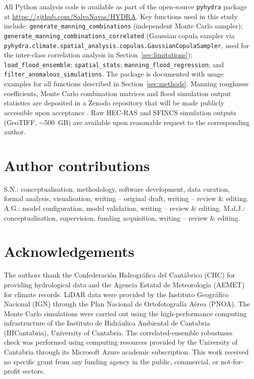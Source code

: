 \documentclass[review,12pt]{elsarticle}
\newcommand{\sfincs}{\textsc{SFINCS}}
\newcommand{\hecras}{\textsc{HEC-RAS}}
\begin{document}
\begin{sloppypar}
All Python analysis code is available as part of the open-source
\texttt{pyhydra} package at \url{https://github.com/SalvaNavas/HYDRA}.
Key functions used in this study include:
\texttt{generate\_manning\_combinations} (independent Monte Carlo sampler);
\texttt{generate\_manning\_combinations\_correlated}
(Gaussian copula sampler via
\texttt{pyhydra.climate.spatial\_analysis.copulas.GaussianCopulaSampler},
used for the inter-class correlation analysis in Section~\ref{sec:limitations});
\texttt{load\_flood\_ensemble};
\texttt{spatial\_stats};
\texttt{manning\_flood\_regression}; and
\texttt{filter\_anomalous\_simulations}.
The package is documented with usage examples for all functions described
in Section~\ref{sec:methods}.
Manning roughness coefficients, Monte Carlo combination matrices and
flood simulation output statistics are deposited in a Zenodo repository
that will be made publicly accessible upon acceptance
\citep{navas2026zenodo}.
Raw \hecras{} and \sfincs{} simulation outputs (GeoTIFF, $\sim$500~GB)
are available upon reasonable request to the corresponding author.
\end{sloppypar}

\section*{Author contributions}

S.N.: conceptualisation, methodology, software development, data curation,
formal analysis, visualisation, writing -- original draft, writing --
review \& editing.
A.G.: model configuration, model validation, writing -- review \& editing.
M.d.J.: conceptualisation, supervision, funding acquisition,
writing -- review \& editing.

\section*{Acknowledgements}

The authors thank the Confederaci\'on Hidrogr\'afica del Cant\'abrico (CHC)
for providing hydrological data and the Agencia Estatal de Meteorolog\'ia
(AEMET) for climate records.
LiDAR data were provided by the Instituto Geogr\'afico Nacional (IGN)
through the Plan Nacional de Ortofotograf\'ia A\'erea (PNOA).
The Monte Carlo simulations were carried out using the high-performance
computing infrastructure of the Instituto de Hidráulica Ambiental de
Cantabria (IHCantabria), University of Cantabria.
The correlated-ensemble robustness check was performed using computing
resources provided by the University of Cantabria through its Microsoft
Azure academic subscription.
This work received no specific grant from any funding agency in the public,
commercial, or not-for-profit sectors.
\end{document}
